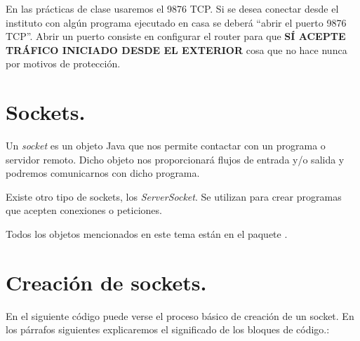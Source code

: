 \documentclass[a4paper,12pt,spanish]{sphinxmanual}
\begin{document}
En las prácticas de clase usaremos el 9876 TCP. Si se desea conectar desde el instituto con algún programa ejecutado en casa se deberá ``abrir el puerto 9876 TCP''. Abrir un puerto consiste en configurar el router para que \textbf{SÍ ACEPTE TRÁFICO INICIADO DESDE EL EXTERIOR} cosa que no hace nunca por motivos de protección.


\section{Sockets.}
\label{textos/tema3:sockets}
Un \emph{socket} es un objeto Java que nos permite contactar con un programa o servidor remoto. Dicho objeto nos proporcionará flujos de entrada y/o salida y podremos comunicarnos con dicho programa.

Existe otro tipo de sockets, los \emph{ServerSocket}. Se utilizan para crear programas que acepten conexiones o peticiones.

Todos los objetos mencionados en este tema están en el paquete .


\section{Creación de sockets.}
\label{textos/tema3:creacion-de-sockets}
En el siguiente código puede verse el proceso básico de creación de un socket. En los párrafos siguientes explicaremos el significado de los bloques de código.:
\end{document}
